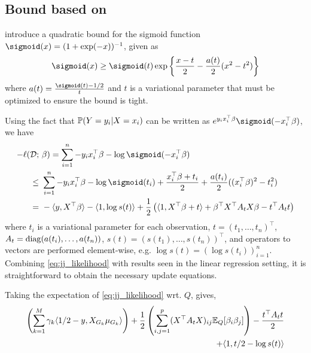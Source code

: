 \subsection{Bound based on \cite{Jakkola97}}

\cite{Jakkola97} introduce a quadratic bound for the sigmoid function $\sigmoid(x) = (1 + \exp(-x))^{-1}$, given as
\begin{equation} \label{eq:jj_bound}
    \sigmoid(x) 
    \geq 
	\sigmoid(t)
	\exp \left\{
	    \frac{x-t}{2}
	    -
	    \frac{a(t)}{2} (x^2 - t^2)
	\right\}
\end{equation}
where $a(t) = \frac{\sigmoid (t) - 1/2}{t}$ and $t$ is a variational parameter that must be optimized to ensure the bound is tight.

Using the fact that $\P(Y=y_i | X=x_i)$ can be written as $e^{y_i x_i^\top \beta} \sigmoid(- x_i^\top \beta)$, we have
\begin{align}
    - \ell(\D; &\ \beta)
    = 
	\sum_{i=1}^n  
	    - y_i x_i^\top \beta 
	    - \log \sigmoid (-x_i^\top \beta)
    \nonumber \\
    \leq &\
	\sum_{i=1}^n  
	    - y_i x_i^\top \beta 
	    - \log \sigmoid (t_i)
	    + \frac{x_i^\top \beta + t_i}{2}
	    + \frac{a(t_i)}{2} ((x_i^\top \beta)^2 - t_i^2)
    \nonumber \\
    = &\ 
	- \langle y,  X^\top \beta \rangle 
	- \langle 1, \log s(t) \rangle
	+ \frac{1}{2} \left(
	    \langle 1, X^\top \beta + t \rangle
	    + \beta^\top X^\top A_t X \beta 
	    - t^\top A_t t
	\right)
    \label{eq:jj_likelihood}
\end{align}
where $t_i$ is a variational parameter for each observation, $t=(t_1, \dots, t_n)^\top$, $A_t =\diag(a(t_i), \dots, a(t_n))$, $s(t) = (s(t_1), \dots, s(t_n))^\top$, and operators to vectors are performed element-wise, e.g. $\log s(t) = (\log s(t_i))_{i=1}^n$. Combining \eqref{eq:jj_likelihood} with results seen in the linear regression setting, it is straightforward to obtain the necessary update equations. 

Taking the expectation of \eqref{eq:jj_likelihood} wrt. $Q$, gives,
\begin{equation} \label{eq:jj_expectation_Q} 
\begin{aligned}
    \left(
    \sum_{k = 1}^M 
	\gamma_k \langle 1/2 - y,  X_{G_k} \mu_{G_k} \rangle 
    \right) 
    +
    \frac{1}{2}
    \left(
	\sum_{i,j=1}^p 
	    (X^\top A_t X)_{ij} \E_Q [ \beta_i \beta_j ]
    \right)
    - 
    \frac{t^\top A_t t}{2}
    \\
    + \langle 1, t/2 - \log s(t) \rangle
\end{aligned}
\end{equation}

